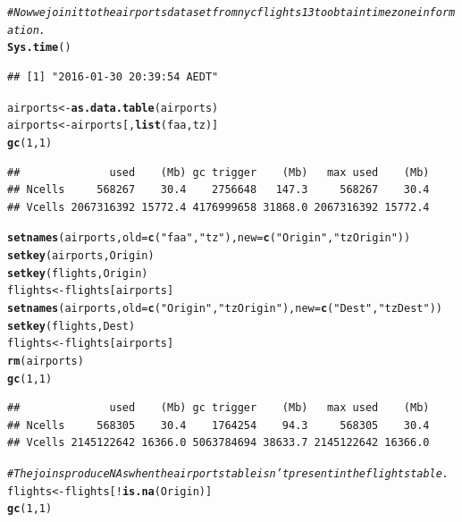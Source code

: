 \documentclass{scrreprt}\usepackage[]{graphicx}\usepackage[]{color}
\makeatletter
\newcommand{\hlnum}[1]{\textcolor[rgb]{0.686,0.059,0.569}{#1}}%
\newcommand{\hlstr}[1]{\textcolor[rgb]{0.192,0.494,0.8}{#1}}%
\newcommand{\hlcom}[1]{\textcolor[rgb]{0.678,0.584,0.686}{\textit{#1}}}%
\newcommand{\hlopt}[1]{\textcolor[rgb]{0,0,0}{#1}}%
\newcommand{\hlstd}[1]{\textcolor[rgb]{0.345,0.345,0.345}{#1}}%
\newcommand{\hlkwb}[1]{\textcolor[rgb]{0.69,0.353,0.396}{#1}}%
\newcommand{\hlkwc}[1]{\textcolor[rgb]{0.333,0.667,0.333}{#1}}%
\newcommand{\hlkwd}[1]{\textcolor[rgb]{0.737,0.353,0.396}{\textbf{#1}}}%
\newenvironment{kframe}{%
 \def\at@end@of@kframe{}%
 \ifinner\ifhmode%
  \def\at@end@of@kframe{\end{minipage}}%
  \begin{minipage}{\columnwidth}%
 \fi\fi%
 \def\FrameCommand##1{\hskip\@totalleftmargin \hskip-\fboxsep
 \colorbox{shadecolor}{##1}\hskip-\fboxsep
     \hskip-\linewidth \hskip-\@totalleftmargin \hskip\columnwidth}%
 \MakeFramed {\advance\hsize-\width
   \@totalleftmargin\z@ \linewidth\hsize
   \@setminipage}}%
 {\par\unskip\endMakeFramed%
 \at@end@of@kframe}
\newenvironment{knitrout}{}{} %
\makeatother
\begin{document}
\begin{knitrout}
\color{fgcolor}\begin{kframe}
\begin{alltt}
\hlcom{# Now we join it to the airports dataset from nycflights13 to obtain time zone information.}
\hlkwd{Sys.time}\hlstd{()}
\end{alltt}
\begin{verbatim}
## [1] "2016-01-30 20:39:54 AEDT"
\end{verbatim}
\begin{alltt}
\hlstd{airports} \hlkwb{<-} \hlkwd{as.data.table}\hlstd{(airports)}
\hlstd{airports} \hlkwb{<-} \hlstd{airports[,}\hlkwd{list}\hlstd{(faa, tz)]}
\hlkwd{gc}\hlstd{(}\hlnum{1}\hlstd{,}\hlnum{1}\hlstd{)}
\end{alltt}
\begin{verbatim}
##              used    (Mb) gc trigger    (Mb)   max used    (Mb)
## Ncells     568267    30.4    2756648   147.3     568267    30.4
## Vcells 2067316392 15772.4 4176999658 31868.0 2067316392 15772.4
\end{verbatim}
\begin{alltt}
\hlkwd{setnames}\hlstd{(airports,} \hlkwc{old} \hlstd{=} \hlkwd{c}\hlstd{(}\hlstr{"faa"}\hlstd{,} \hlstr{"tz"}\hlstd{),} \hlkwc{new} \hlstd{=} \hlkwd{c}\hlstd{(}\hlstr{"Origin"}\hlstd{,} \hlstr{"tzOrigin"}\hlstd{))}
\hlkwd{setkey}\hlstd{(airports, Origin)}
\hlkwd{setkey}\hlstd{(flights, Origin)}
\hlstd{flights} \hlkwb{<-} \hlstd{flights[airports]}
\hlkwd{setnames}\hlstd{(airports,} \hlkwc{old} \hlstd{=} \hlkwd{c}\hlstd{(}\hlstr{"Origin"}\hlstd{,} \hlstr{"tzOrigin"}\hlstd{),} \hlkwc{new} \hlstd{=} \hlkwd{c}\hlstd{(}\hlstr{"Dest"}\hlstd{,} \hlstr{"tzDest"}\hlstd{))}
\hlkwd{setkey}\hlstd{(flights, Dest)}
\hlstd{flights} \hlkwb{<-} \hlstd{flights[airports]}
\hlkwd{rm}\hlstd{(airports)}
\hlkwd{gc}\hlstd{(}\hlnum{1}\hlstd{,}\hlnum{1}\hlstd{)}
\end{alltt}
\begin{verbatim}
##              used    (Mb) gc trigger    (Mb)   max used    (Mb)
## Ncells     568305    30.4    1764254    94.3     568305    30.4
## Vcells 2145122642 16366.0 5063784694 38633.7 2145122642 16366.0
\end{verbatim}
\begin{alltt}
\hlcom{# The joins produce NAs when the airports table isn't present in the flights table.}
\hlstd{flights} \hlkwb{<-} \hlstd{flights[}\hlopt{!}\hlkwd{is.na}\hlstd{(Origin)]}
\hlkwd{gc}\hlstd{(}\hlnum{1}\hlstd{,}\hlnum{1}\hlstd{)}

\end{alltt}
\end{kframe}
\end{knitrout}
\end{document}
